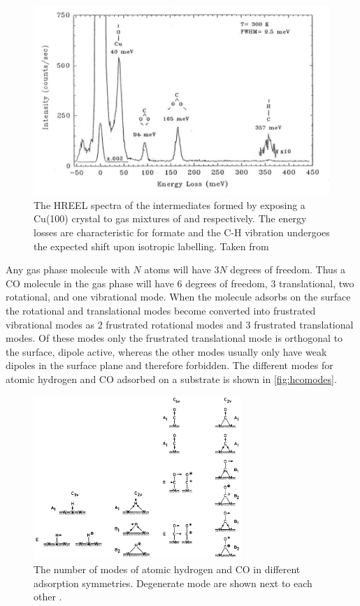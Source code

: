 \begin{figure}[h!]
	\begin{center}
	\includegraphics[scale=4]{figures/08_04.png}
	\caption{The HREEL spectra of the intermediates formed by exposing a Cu(100) crystal to gas mixtures of   and   respectively. The energy losses are characteristic for formate and the C-H vibration undergoes the expected shift upon isotropic labelling. Taken from \cite{Formate}}
	\label{fig:cuhreels}
	\end{center}
\end{figure}

Any gas phase molecule with $N$ atoms  will have $3N$ degrees of freedom. Thus a CO molecule in the gas phase will have 6 degrees of freedom, 3 translational, two rotational, and one vibrational mode. When the molecule adsorbs on the surface the rotational and translational modes become converted into frustrated vibrational modes as 2 frustrated rotational modes and 3 frustrated translational modes. Of these modes only the frustrated translational mode is orthogonal to the surface, dipole active, whereas the other modes usually only have weak dipoles in the surface plane and therefore forbidden. The different modes for atomic hydrogen and CO adsorbed on a substrate is shown in \autoref{fig:hcomodes}.

\begin{figure}[h!]
	\begin{center}
	\includegraphics[width=0.7\textwidth]{figures/modes_of_adsorbed_h2_and_CO.png}
	\caption{The number of modes of atomic hydrogen and CO in different adsorption symmetries. Degenerate mode are shown next to each other \cite{Bradshaw}.}
	\label{fig:hcomodes}
	\end{center}
\end{figure}

